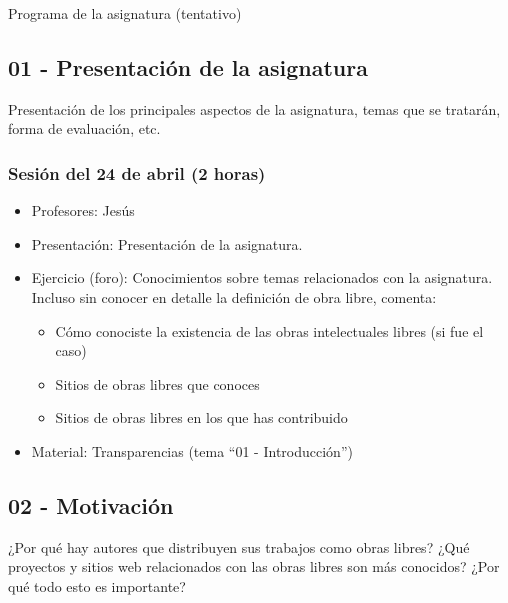 \documentclass[a4paper,12pt]{article}
\begin{document}
Programa de la asignatura (tentativo)

\subsection{01 - Presentación de la asignatura}

Presentación de los principales aspectos de la asignatura, temas que se tratarán, forma de evaluación, etc.

\subsubsection{Sesión del 24 de abril (2 horas)}

 \begin{itemize}
 \item Profesores: Jesús
 \item Presentación: Presentación de la asignatura.
 \item Ejercicio (foro): Conocimientos sobre temas relacionados con la asignatura. \\
   Incluso sin conocer en detalle la definición de obra libre, comenta:
   \begin{itemize}
   \item Cómo conociste la existencia de las obras intelectuales libres (si fue el caso)
   \item Sitios de obras libres que conoces
   \item Sitios de obras libres en los que has contribuido
   \end{itemize}
 \item Material: Transparencias (tema ``01 - Introducción'')
 \end{itemize}

\subsection{02 - Motivación}

¿Por qué hay autores que distribuyen sus trabajos como obras libres? ¿Qué proyectos y sitios web relacionados con las obras libres son más conocidos? ¿Por qué todo esto es importante?

\end{document}
